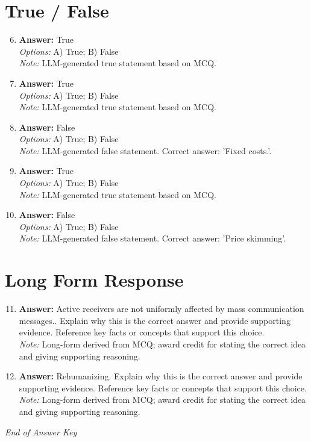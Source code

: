 \documentclass[12pt]{article}
\begin{document}
\section*{True / False}
\begin{enumerate}[label=\arabic*.]
\setcounter{enumi}{5}
\item \textbf{Answer:} True
\\ \textit{Options:} A) True; B) False
\\ \textit{Note:} LLM-generated true statement based on MCQ.
\item \textbf{Answer:} True
\\ \textit{Options:} A) True; B) False
\\ \textit{Note:} LLM-generated true statement based on MCQ.
\item \textbf{Answer:} False
\\ \textit{Options:} A) True; B) False
\\ \textit{Note:} LLM-generated false statement. Correct answer: 'Fixed costs.'.
\item \textbf{Answer:} True
\\ \textit{Options:} A) True; B) False
\\ \textit{Note:} LLM-generated true statement based on MCQ.
\item \textbf{Answer:} False
\\ \textit{Options:} A) True; B) False
\\ \textit{Note:} LLM-generated false statement. Correct answer: 'Price skimming'.
\end{enumerate}

\section*{Long Form Response}
\begin{enumerate}[label=\arabic*.]
\setcounter{enumi}{10}
\item \textbf{Answer:} Active receivers are not uniformly affected by mass communication messages.. Explain why this is the correct answer and provide supporting evidence. Reference key facts or concepts that support this choice.
\\ \textit{Note:} Long-form derived from MCQ; award credit for stating the correct idea and giving supporting reasoning.
\item \textbf{Answer:} Rehumanizing. Explain why this is the correct answer and provide supporting evidence. Reference key facts or concepts that support this choice.
\\ \textit{Note:} Long-form derived from MCQ; award credit for stating the correct idea and giving supporting reasoning.
\end{enumerate}

\vfill
\noindent\textit{End of Answer Key}
\end{document}
